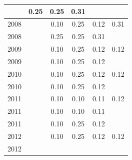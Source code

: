 \begin{table}[H]
\begin{tabular}{| l | c | c | c | c | c |}
          &
          0.25
          &
          0.25
          &
          0.31
          &
          \\
\hline
            2008
          &
          
          &
          0.10
          &
          0.25
          &
          0.12
          &
            {\color{red} 0.31}
          \\
            2008
          &
          
          &
          0.25
          &
          0.25
          &
          0.31
          &
          \\
\hline
            2009
          &
          
          &
          0.10
          &
          0.25
          &
          0.12
          &
            {\color{red} 0.12}
          \\
            2009
          &
          
          &
          0.10
          &
          0.25
          &
          0.12
          &
          \\
\hline
            2010
          &
          
          &
          0.10
          &
          0.25
          &
          0.12
          &
            {\color{red} 0.12}
          \\
            2010
          &
          
          &
          0.10
          &
          0.25
          &
          0.12
          &
          \\
\hline
            2011
          &
          
          &
          0.10
          &
          0.10
          &
          0.11
          &
            {\color{red} 0.12}
          \\
            2011
          &
          
          &
          0.10
          &
          0.10
          &
          0.11
          &
          \\
            2011
          &
          
          &
          0.10
          &
          0.25
          &
          0.12
          &
          \\
\hline
            2012
          &
          
          &
          0.10
          &
          0.25
          &
          0.12
          &
            {\color{red} 0.12}
          \\
            2012
          &
          

\end{tabular}
\end{table}
